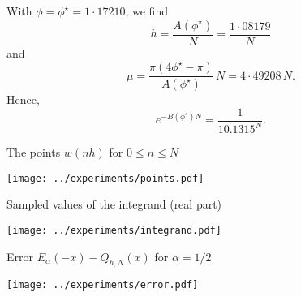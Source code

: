 \documentclass{beamer}
\begin{document}
\begin{frame}
With $\phi=\phi^\star=1{\cdot}17210$, we find
\[
h=\frac{A(\phi^\star)}{N}=\frac{1{\cdot}08179}{N}
\]
and
\[
\mu=\frac{\pi(4\phi^\star-\pi)}{A(\phi^\star)}\,N=4{\cdot}49208\,N.
\]
Hence,
\[
e^{-B(\phi^\star)N}=\frac{1}{10.1315^N}.
\]
\end{frame}
\begin{frame}{The points $w(nh)$ for $0\le n\le N$}
\begin{center}
\texttt{[image: ../experiments/points.pdf]} 
\end{center}
\end{frame}
\begin{frame}{Sampled values of the integrand (real part)}
\begin{center}
\texttt{[image: ../experiments/integrand.pdf]} 
\end{center}
\end{frame}
\begin{frame}{Error $E_\alpha(-x)-Q_{h,N}(x)$ for $\alpha=1/2$}
\begin{center}
\texttt{[image: ../experiments/error.pdf]} 
\end{center}
\end{frame}

\end{document}
